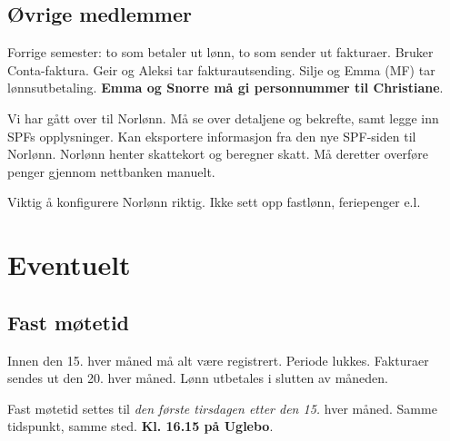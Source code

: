 \documentclass{article}[12pt]
\begin{document}
\subsection{Øvrige medlemmer}
Forrige semester: to som betaler ut lønn, to som sender ut fakturaer.
Bruker Conta-faktura. 
Geir og Aleksi tar fakturautsending.
Silje og Emma (MF) tar lønnsutbetaling. 
\textbf{Emma og Snorre må gi personnummer til Christiane}.

Vi har gått over til Norlønn.
Må se over detaljene og bekrefte, samt legge inn
SPFs opplysninger.
Kan eksportere informasjon fra den nye SPF-siden til Norlønn.
Norlønn henter skattekort og beregner skatt.
Må deretter overføre penger gjennom nettbanken manuelt.

Viktig å konfigurere Norlønn riktig. Ikke sett opp fastlønn, feriepenger e.l.
\section{Eventuelt}
\subsection{Fast møtetid}
Innen den 15. hver måned må alt være registrert. Periode lukkes.
Fakturaer sendes ut den 20. hver måned.
Lønn utbetales i slutten av måneden.

Fast møtetid settes til \textit{den første tirsdagen etter den 15.} hver måned.
Samme tidspunkt, samme sted. \textbf{Kl. 16.15 på Uglebo}.
\end{document}
